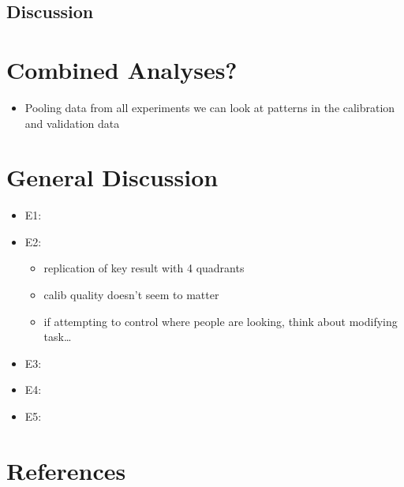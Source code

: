 \documentclass[
  man,floatsintext]{apa6}
\providecommand{\tightlist}{%
  \setlength{\itemsep}{0pt}\setlength{\parskip}{0pt}}
\begin{document}
\hypertarget{discussion-4}{%
\subsection{Discussion}\label{discussion-4}}

\hypertarget{combined-analyses}{%
\section{Combined Analyses?}\label{combined-analyses}}

\begin{itemize}
\tightlist
\item
  Pooling data from all experiments we can look at patterns in the
  calibration and validation data
\end{itemize}

\hypertarget{general-discussion}{%
\section{General Discussion}\label{general-discussion}}

\begin{itemize}
\item
  E1:
\item
  E2:

  \begin{itemize}
  \tightlist
  \item
    replication of key result with 4 quadrants
  \item
    calib quality doesn't seem to matter
  \item
    if attempting to control where people are looking, think about modifying task\ldots{}
  \end{itemize}
\item
  E3:
\item
  E4:
\item
  E5:
\end{itemize}

\newpage

\hypertarget{references}{%
\section{References}\label{references}}

\begingroup
\setlength{\parindent}{-0.5in}
\setlength{\leftskip}{0.5in}
\end{document}
